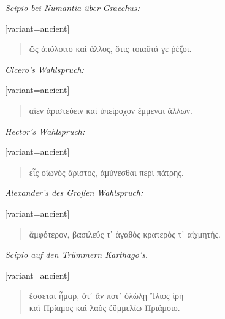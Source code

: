 \noindent \begin{center}
\emph{Scipio bei Numantia über Gracchus:}
\par\end{center}
\begin{greek}[variant=ancient]%
\begin{quote}
ὥς ἀπόλοιτο καὶ ἄλλος, ὅτις τοιαῦτά γε ῥέζοι. 

\end{quote}
\end{greek}%
\noindent \begin{center}
\emph{Cicero's Wahlspruch:}
\par\end{center}
\begin{greek}[variant=ancient]%
\begin{quote}
αἲεν ἀριστεύειν καὶ ὑπείροχον ἔμμεναι ἄλλων. 

\end{quote}
\end{greek}%
\noindent \begin{center}
\emph{Hector's Wahlspruch:}
\par\end{center}
\begin{greek}[variant=ancient]%
\begin{quote}
εἷς οἰωνὸς ἄριστος, ἀμύνεσθαι περὶ πάτρης. 

\end{quote}
\end{greek}%
\noindent \begin{center}
\emph{Alexander's des Großen Wahlspruch:}
\par\end{center}
\begin{greek}[variant=ancient]%
\begin{quote}
ἄμφότερον, βασιλεύς τ᾽ ἀγαθός κρατερός τ᾽ αἰχμητής. 

\end{quote}
\end{greek}%
\noindent \begin{center}
\emph{Scipio auf den Trümmern Karthago's.}
\par\end{center}
\begin{greek}[variant=ancient]%
\begin{quote}
ἔσσεται ἦμαρ, ὅτ᾽ ἄν ποτ᾽ ὀλώλῃ Ἴλιος ἱρή\\
καὶ Πρίαμος καὶ λαὸς ἐϋμμελίω Πριάμοιο. 

\end{quote}
\end{greek}%
